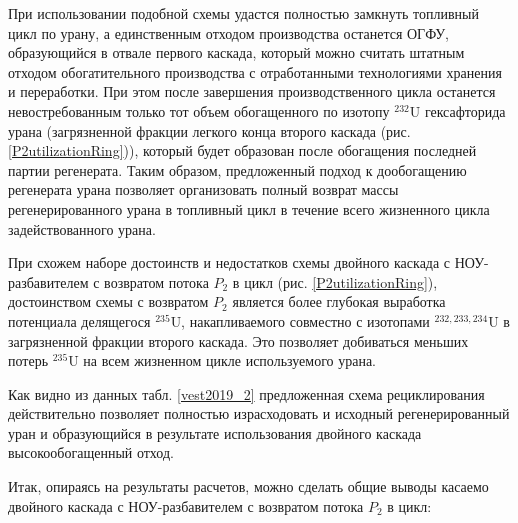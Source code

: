 При использовании подобной схемы удастся полностью замкнуть топливный цикл по урану, а единственным отходом производства останется ОГФУ, образующийся в отвале первого каскада, который можно считать штатным отходом обогатительного производства с отработанными технологиями хранения и переработки. При этом после завершения производственного цикла останется невостребованным только тот объем обогащенного по изотопу $^{232}$U гексафторида урана (загрязненной фракции легкого конца второго каскада (рис. \ref{P2utilizationRing})), который будет образован после обогащения последней партии регенерата. Таким образом, предложенный подход к дообогащению регенерата урана позволяет организовать полный возврат массы регенерированного урана в топливный цикл в течение всего жизненного цикла задействованного урана.

При схожем наборе достоинств и недостатков схемы двойного каскада с НОУ-разбавителем с возвратом потока $P_2$ в цикл (рис. \ref{P2utilizationRing}), достоинством схемы с возвратом $P_2$ является более глубокая выработка потенциала делящегося $^{235}$U, накапливаемого совместно с изотопами $^{232,233,234}$U в загрязненной фракции второго каскада. Это позволяет добиваться меньших потерь $^{235}$U на всем жизненном цикле используемого урана.



Как видно из данных табл. \ref{vest2019_2} предложенная схема рециклирования действительно позволяет полностью израсходовать и исходный регенерированный уран и образующийся в результате использования двойного каскада высокообогащенный отход.

Итак, опираясь на результаты расчетов, можно сделать общие выводы касаемо двойного каскада с НОУ-разбавителем с возвратом потока $P_2$ в цикл:

